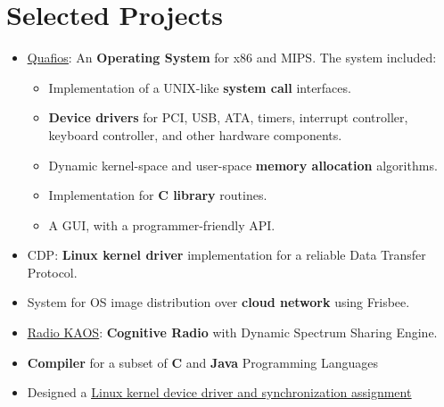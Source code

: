 \documentclass[letterpaper]{twentysecondcv} %
\newcommand{\myhy}[2]{\underline{\href{#1}{#2}}}
\begin{document}

\section{Selected Projects}

\begin{itemize}
    \item{\myhy{https://github.com/quafios/quafios}{Quafios}:
          An \textbf{{Operating System}} for x86 and MIPS. The system included:
          \begin{itemize}
            \item Implementation of a UNIX-like \textbf{{system call}} interfaces.
            \item \textbf{{Device drivers}} for PCI, USB, ATA, timers, interrupt controller,
                  keyboard controller, and other hardware components.
            \item Dynamic kernel-space and user-space \textbf{{memory allocation}} algorithms.
            \item Implementation for \textbf{{C library}} routines.
            \item A GUI, with a programmer-friendly API.
          \end{itemize}
          }
    \item{CDP: \textbf{{Linux kernel driver}} implementation for a reliable Data Transfer Protocol.}
    \item{System for OS image distribution over \textbf{{cloud network}} using Frisbee.} 
    \item{\myhy{https://github.com/iocoder/wncp}{Radio KAOS}: \textbf{{Cognitive Radio}} with Dynamic Spectrum Sharing Engine.}
    \item{\textbf{{Compiler}} for a subset of \textbf{{C}} and
          \textbf{{Java}} Programming Languages}
    \item{Designed a \myhy{https://github.com/iocoder/cs333_f16_lab2/raw/master/CS333_F16_Lab2.pdf}{Linux kernel device driver and synchronization assignment}
}
\end{itemize}
\end{document}

